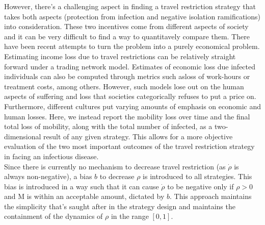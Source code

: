 However, there's a challenging aspect in finding a travel restriction strategy that takes both aspects (protection from infection and negative isolation ramifications) into consideration. These two incentives come from different aspects of society and it can be very difficult to find a way to quantitavely compare them. There have been recent attempts to turn the problem into a purely economical problem. Estimating income loss due to travel restrictions can be relatively straight forward under a trading network model. Estimates of economic loss due infected individuals can also be computed through metrics such asloss of work-hours or treatment costs, among others. However, such models lose out on the human aspects of suffering and loss that societies categorically refuses to put a price on. Furthermore, different cultures put varying amounts of emphasis on economic and human losses. Here, we instead report the mobility loss over time and the final total loss of mobility, along with the total number of infected, as a two-dimensional result of any given strategy. This allows for a more objective evaluation of the two most important outcomes of the travel restriction strategy in facing an infectious disease.\\

Since there is currently no mechanism to decrease travel restriction (as $\dot \rho$ is always non-negative), a bias $b$ to decrease $\rho$ is introduced to all strategies. This bias is introduced in a way such that it can cause $\dot \rho$ to be negative only if $\rho>0$ and M is within an acceptable amount, dictated by $b$. This approach maintains the simplicity that's saught after in the strategy design and maintains the containment of the dynamics of $\rho$ in the range $[0,1]$.\\

